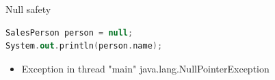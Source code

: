 \documentclass{beamer}
\begin{document}



\begin{frame}[fragile]{Null safety}
  \begin{lstlisting}[language=Kotlin, title=Java example, xleftmargin=1em]
SalesPerson person = null;
System.out.println(person.name);
  \end{lstlisting}
  \begin{itemize}
    \item Exception in thread "main" java.lang.NullPointerException
  \end{itemize}
\end{frame}
\end{document}
